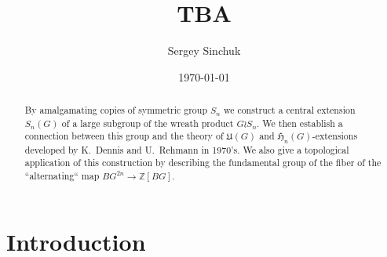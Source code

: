 \documentclass[oneside, 12pt]{amsart}
\title{TBA}
\author {Sergey Sinchuk}
\date {\today}
\theoremstyle{plain}
\numberwithin{equation}{section}
\numberwithin{lemma}{section}
\theoremstyle{remark}
\theoremstyle{definition}
\DeclareMathOperator{\colim}{colim}
\begin{document}
\begin{abstract} By amalgamating copies of symmetric group $S_n$ we construct a central extension $S_n(G)$ of a large subgroup of the wreath product $G \wr S_n$.
We then establish a connection between this group and the theory of $\mathfrak{U}(G)$ and $\mathfrak{H}_n(G)$-extensions developed by K.~Dennis and U.~Rehmann in 1970's.
We also give a topological application of this construction by describing the fundamental group of the fiber of the ``alternating`` map $BG^{2n}\to \mathbb{Z}[BG]$.
\end{abstract}

\maketitle

\section{Introduction}
\begin{comment}
Let $G$ be a group. In~\cite{De76} K.~Dennis defined certain central extension $(G, G)$ of the derived subgroup $[G, G]$ 
 (see section~\ref{ssec:extensions} below for the definition).
This extension is a quotient of the nonabelian tensor square $G \otimes G$ (but is itself an extension of $\bigwedge^2G$) such that the kernel of the natural map $(G, G) \to [G, G]$ 
 is Dennis functor $\widetilde{H}_2(G, \mathbb{Z})$.
Under the notation $U(G)$ the same extension appears in U.~Rehmann's paper~\cite{Reh78}, where it is used to formulate the noncommutative version of Matsumoto theorem.
Recall that this theorem asserts for a skew-field $D$ that the group $K_2(D)$ is precisely the quotient of $\widetilde{H}_2(D^*, \mathbb{Z})$ modulo Steinberg relations $\{u, 1-u\} = 1$, $u\in D^*$.

The aim of this note is to describe yet another situation in which the groups $(G, G)$ and $\Lambda^2(G)$ make an appearance.

{\bf TODO: Mention new simpler presentation of Rehmann's extensions for $n\geq 4$}


Unsurprisingly, the main motivation for the definition of the group $S_n(G)$ comes from algebraic topology.
More specifically, our initial question was to describe the fiber of the ''alternating map`` $X^{2n} \to \mathbb{Z}[X]$ in the special case $X=BG$.
\end{comment}
\end{document}
